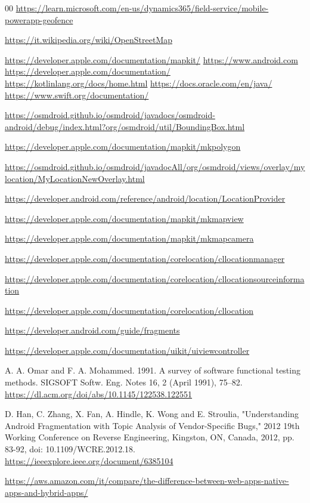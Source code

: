 %
%
\begin{thebibliography}{00}
\url{https://learn.microsoft.com/en-us/dynamics365/field-service/mobile-powerapp-geofence}

\url{https://it.wikipedia.org/wiki/OpenStreetMap}

\url{https://developer.apple.com/documentation/mapkit/}
%
\url{https://www.android.com}
%
\url{https://developer.apple.com/documentation/}
%
\url{https://kotlinlang.org/docs/home.html}
%
\url{https://docs.oracle.com/en/java/}
%
\url{https://www.swift.org/documentation/}

\url{https://osmdroid.github.io/osmdroid/javadocs/osmdroid-android/debug/index.html?org/osmdroid/util/BoundingBox.html}

\url{https://developer.apple.com/documentation/mapkit/mkpolygon}

\url{https://osmdroid.github.io/osmdroid/javadocAll/org/osmdroid/views/overlay/mylocation/MyLocationNewOverlay.html}

\url{https://developer.android.com/reference/android/location/LocationProvider}

\url{https://developer.apple.com/documentation/mapkit/mkmapview}

\url{https://developer.apple.com/documentation/mapkit/mkmapcamera}

\url{https://developer.apple.com/documentation/corelocation/cllocationmanager}

\url{https://developer.apple.com/documentation/corelocation/cllocationsourceinformation}

\url{https://developer.apple.com/documentation/corelocation/cllocation}

\url{https://developer.android.com/guide/fragments}

\url{https://developer.apple.com/documentation/uikit/uiviewcontroller}

A. A. Omar and F. A. Mohammed. 1991. A survey of software functional testing methods. SIGSOFT Softw. Eng. Notes 16, 2 (April 1991), 75–82.
\url{https://dl.acm.org/doi/abs/10.1145/122538.122551}

D. Han, C. Zhang, X. Fan, A. Hindle, K. Wong and E. Stroulia, "Understanding Android Fragmentation with Topic Analysis of Vendor-Specific Bugs," 2012 19th Working Conference on Reverse Engineering, Kingston, ON, Canada, 2012, pp. 83-92, doi: 10.1109/WCRE.2012.18.
\url{https://ieeexplore.ieee.org/document/6385104}

\url{https://aws.amazon.com/it/compare/the-difference-between-web-apps-native-apps-and-hybrid-apps/}
\end{thebibliography}
% 

